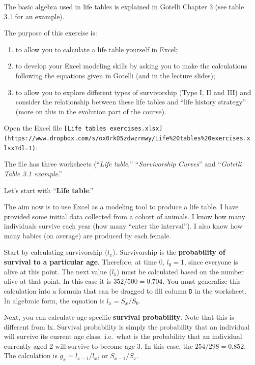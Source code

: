 \documentclass[
  a4paper]{book}
\providecommand{\tightlist}{%
  \setlength{\itemsep}{0pt}\setlength{\parskip}{0pt}}
\begin{document}
The basic algebra used in life tables is explained in Gotelli Chapter 3
(see table 3.1 for an example).

The purpose of this exercise is:

\begin{enumerate}
\def\labelenumi{\arabic{enumi}.}
\tightlist
\item
  to allow you to calculate a life table yourself in Excel;
\item
  to develop your Excel modeling skills by asking you to make the
  calculations following the equations given in Gotelli (and in the
  lecture slides);
\item
  to allow you to explore different types of survivorship (Type I, II
  and III) and consider the relationship between these life tables and
  ``life history strategy'' (more on this in the evolution part of the
  course).
\end{enumerate}

Open the Excel file
\texttt{{[}Life\ tables\ exercises.xlsx{]}(https://www.dropbox.com/s/ox0rk05zdwzrmwy/Life\%20tables\%20exercises.xlsx?dl=1)}.

The file has three worksheets (``\emph{Life table},''
``\emph{Survivorship Curves}'' and ``\emph{Gotelli Table 3.1 example}.''

Let's start with ``\textbf{Life table}.''

The aim now is to use Excel as a modeling tool to produce a life table.
I have provided some initial data collected from a cohort of animals. I
know how many individuals survive each year (how many ``enter the
interval''). I also know how many babies (on average) are produced by
each female.

Start by calculating survivorship (\(l_x\)). Survivorship is the
\textbf{probability of survival to a particular age}. Therefore, at time
0, \(l_0 = 1\), since everyone is alive at this point. The next value
(\(l_1\)) must be calculated based on the number alive at that point. In
this case it is \(352/500 = 0.704\). You must generalize this
calculation into a formula that can be dragged to fill column \texttt{D}
in the worksheet. In algebraic form, the equation is \(l_x = S_x/S_0\).

Next, you can calculate age specific \textbf{survival probability}. Note
that this is different from lx. Survival probability is simply the
probability that an individual will survive its current age class.
i.e.~what is the probability that an individual currently aged 2 will
survive to become age 3. In this case, the \(254/298 = 0.852\). The
calculation is \(g_x = l_{x-1}/l_x\), or \(S_{x-1}/S_x\).
\end{document}
